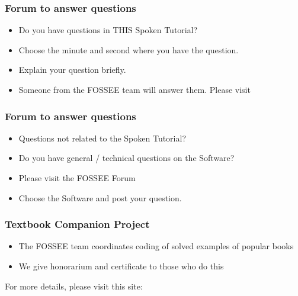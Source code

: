 \documentclass[17pt]{beamer}
\begin{document}
\begin{frame}
	\frametitle{Forum to answer questions}
	\begin{itemize}
		\item Do you have questions in THIS Spoken Tutorial?
		\item Choose the minute and second where you have the question.
		\item Explain your question briefly.
		\item Someone from the FOSSEE team will answer them. Please visit 
	\end{itemize}
	\begin{center}
		{\color{blue}{http://forums.spoken-tutorial.org/}}
	\end{center} 
\end{frame}
\begin{frame}
	\frametitle{Forum to answer questions}
	\begin{itemize}
		\item Questions not related to the Spoken Tutorial?
		\item Do you have general / technical questions on the Software?
		\item Please visit the FOSSEE Forum
		\begin{center}
			{\color{blue}{http://forums.fossee.in/}}
		\end{center}
		\item Choose the Software and post your question.
	\end{itemize}
\end{frame}
\begin{frame}
	\frametitle{Textbook Companion Project}
	\begin{itemize}
		\item The FOSSEE team coordinates coding of solved examples of popular
		books 
		\item We give honorarium and certificate to those who do this
	\end{itemize}
	For more details, please visit this site:
	\begin{center}
		{\color{blue}{http://tbc-python.fossee.in/}}
	\end{center}
\end{frame}
\end{document}
